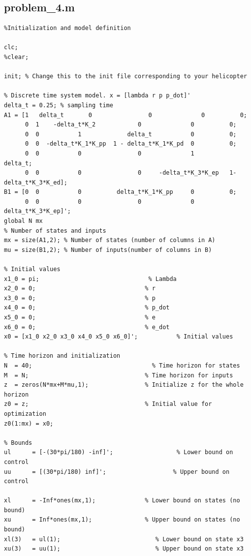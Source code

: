 \subsection{problem\_4.m}\label{sec:p4}
\begin{verbatim}
%Initialization and model definition

clc;
%clear;

init; % Change this to the init file corresponding to your helicopter

% Discrete time system model. x = [lambda r p p_dot]'
delta_t	= 0.25; % sampling time
A1 = [1   delta_t       0                0              0          0;
      0  1    -delta_t*K_2            0              0          0;
      0  0           1             delta_t           0          0;
      0  0  -delta_t*K_1*K_pp  1 - delta_t*K_1*K_pd  0          0;
      0  0           0                0              1          delta_t;
      0  0           0                0     -delta_t*K_3*K_ep   1-delta_t*K_3*K_ed];
B1 = [0  0           0          delta_t*K_1*K_pp     0          0;
      0  0           0                0              0          delta_t*K_3*K_ep]';
global N mx
% Number of states and inputs
mx = size(A1,2); % Number of states (number of columns in A)
mu = size(B1,2); % Number of inputs(number of columns in B)

% Initial values
x1_0 = pi;                               % Lambda
x2_0 = 0;                               % r
x3_0 = 0;                               % p
x4_0 = 0;                               % p_dot
x5_0 = 0;                               % e
x6_0 = 0;                               % e_dot
x0 = [x1_0 x2_0 x3_0 x4_0 x5_0 x6_0]';           % Initial values

% Time horizon and initialization
N  = 40;                                  % Time horizon for states
M  = N;                                 % Time horizon for inputs
z  = zeros(N*mx+M*mu,1);                % Initialize z for the whole horizon
z0 = z;                                 % Initial value for optimization
z0(1:mx) = x0;

% Bounds
ul 	    = [-(30*pi/180) -inf]';                  % Lower bound on control
uu 	    = [(30*pi/180) inf]';                   % Upper bound on control

xl      = -Inf*ones(mx,1);              % Lower bound on states (no bound)
xu      = Inf*ones(mx,1);               % Upper bound on states (no bound)
xl(3)   = ul(1);                           % Lower bound on state x3
xu(3)   = uu(1);                           % Upper bound on state x3


\end{verbatim}
